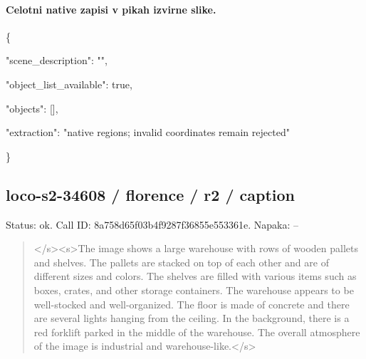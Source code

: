 \documentclass[10pt,a4paper]{article}
\begin{document}
\paragraph{Celotni native zapisi v pikah izvirne slike.}
\{\par
  "scene\_description":\allowbreak{} "",\allowbreak{}\par
  "object\_list\_available":\allowbreak{} true,\allowbreak{}\par
  "objects":\allowbreak{} [],\allowbreak{}\par
  "extraction":\allowbreak{} "native regions; invalid coordinates remain rejected"\par
\}
\subsection*{loco-s2-34608 / florence / r2 / caption}
Status: ok. Call ID: 8a758d65f03b4f9287f36855e553361e. Napaka: --
\begin{quote}\footnotesize
</s>\allowbreak{}<s>\allowbreak{}The image shows a large warehouse with rows of wooden pallets and shelves. The pallets are stacked on top of each other and are of different sizes and colors. The shelves are filled with various items such as boxes,\allowbreak{} crates,\allowbreak{} and other storage containers. The warehouse appears to be well-stocked and well-organized. The floor is made of concrete and there are several lights hanging from the ceiling. In the background,\allowbreak{} there is a red forklift parked in the middle of the warehouse. The overall atmosphere of the image is industrial and warehouse-like.</s>\allowbreak{}
\end{quote}
\end{document}
